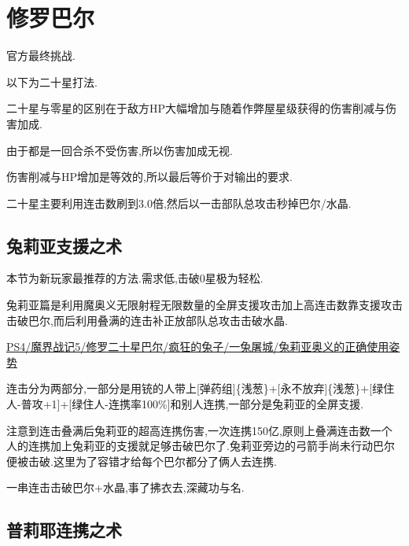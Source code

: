 \newpage

\section{修罗巴尔}

官方最终挑战.

{\color{red}{如果准备了大概200个万灵药做的咖喱可以不需要装备就达到20亿血,简化辅助人员的需求}}

	\newpage
	
	以下为二十星打法.

	二十星与零星的区别在于敌方HP大幅增加与随着作弊屋星级获得的伤害削减与伤害加成.

	由于都是一回合杀不受伤害,所以伤害加成无视.

	伤害削减与HP增加是等效的,所以最后等价于对输出的要求.

	二十星主要利用连击数刷到3.0倍,然后以一击部队总攻击秒掉巴尔/水晶.

	{\color{red}{如果准备了大概200个万灵药做的咖喱可以不需要装备就达到20亿血,简化辅助人员的需求}}

	\newpage

	\subsection{兔莉亚支援之术}

	本节为新玩家最推荐的方法.需求低,击破0星极为轻松.

	兔莉亚篇是利用魔奥义无限射程无限数量的全屏支援攻击加上高连击数靠支援攻击击破巴尔,而后利用叠满的连击补正放部队总攻击击破水晶.

	\href{http://www.bilibili.com/video/av2989748/}{PS4/魔界战记5/修罗二十星巴尔/疯狂的兔子/一兔屠城/兔莉亚奥义的正确使用姿势}


	连击分为两部分,一部分是用铳的人带上[弹药组]\{浅葱\}+[永不放弃]\{浅葱\}+[绿住人-普攻+1]+[绿住人-连携率100\%]和别人连携,一部分是兔莉亚的全屏支援.

	注意到连击叠满后兔莉亚的超高连携伤害,一次连携150亿,原则上叠满连击数一个人的连携加上兔莉亚的支援就足够击破巴尔了.兔莉亚旁边的弓箭手尚未行动巴尔便被击破.这里为了容错才给每个巴尔都分了俩人去连携.

	一串连击击破巴尔+水晶,事了拂衣去,深藏功与名.

	\newpage

	\subsection{普莉耶连携之术}

